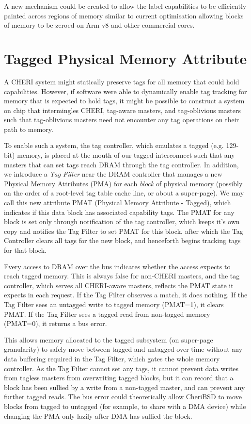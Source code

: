 A new mechanism could be created to allow the label capabilities to be
efficiently painted across regions of memory similar to current
optimisation allowing blocks of memory to be zeroed on Arm v8 and
other commercial cores.

\section{Tagged Physical Memory Attribute}

A CHERI system might statically preserve tags for all memory that could hold capabilities.
However, if software were able to dynamically enable tag tracking for memory that is expected to hold tags, it might be possible to construct a system on chip that intermingles CHERI, tag-aware masters, and tag-oblivious masters such that tag-oblivious masters need not encounter any tag operations on their path to memory.

To enable such a system, the tag controller, which emulates a tagged (e.g. 129-bit) memory, is placed at the mouth of our tagged interconnect such that any masters that can set tags reach DRAM through the tag controller.
In addition, we introduce a \emph{Tag Filter} near the DRAM controller that manages a new Physical Memory Attributes (PMA) for each \emph{block} of physical memory (possibly on the order of a root-level tag table cache line, or about a super-page).
We may call this new attribute PMAT (Physical Memory Attribute - Tagged), which indicates if this data block has associated capability tags.
The PMAT for any block is set only through notification of the tag controller, which keeps it's own copy and notifies the Tag Filter to set PMAT for this block, after which the Tag Controller clears all tags for the new block, and henceforth begins tracking tags for that block.

Every access to DRAM over the bus indicates whether the access expects to reach tagged memory.
This is always false for non-CHERI masters, and the tag controller, which serves all CHERI-aware masters, reflects the PMAT state it expects in each request.
If the Tag Filter observes a match, it does nothing.
If the Tag Filter sees an untagged write to tagged memory (PMAT=1), it clears PMAT.
If the Tag Filter sees a tagged read from non-tagged memory (PMAT=0), it returns a bus error.

This allows memory allocated to the tagged subsystem (on super-page granularity) to safely move between tagged and untagged over time without any data buffering required in the Tag Filter, which gates the whole memory controller.
As the Tag Filter cannot set any tags, it cannot prevent data writes from tagless masters from overwriting tagged blocks, but it can record that a block has been sullied by a write from a non-tagged master, and can prevent any further tagged reads.
The bus error could theoretically allow CheriBSD to move blocks from tagged to untagged (for example, to share with a DMA device) while changing the PMA only lazily after DMA has sullied the block.

